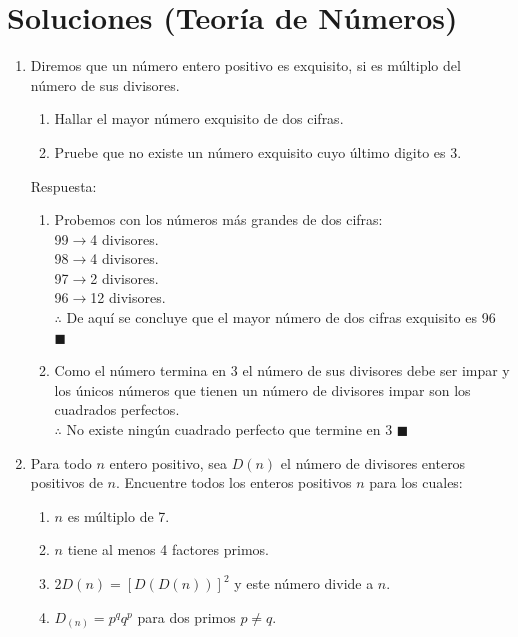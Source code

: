 \documentclass{book}
\begin{document}
    \section{Soluciones (Teoría de Números)}
    \begin{enumerate}
        \item Diremos que un número entero positivo es exquisito, si es múltiplo del número de sus divisores.

        \begin{enumerate}
            \item  Hallar el mayor número exquisito de dos cifras.
            \item Pruebe que no existe un número exquisito cuyo último digito es 3.
        \end{enumerate}
        Respuesta:
        \begin{enumerate}
            \item Probemos con los números más grandes de dos cifras:\\
            99$\rightarrow$4 divisores.\\
            98$\rightarrow$4 divisores.\\
            97$\rightarrow$2 divisores.\\
            96$\rightarrow$12 divisores.\\
            $ \therefore$ De aquí se concluye que el mayor número de dos cifras exquisito es 96 $\blacksquare$
            \item  Como el número termina en 3 el número de sus divisores debe ser impar y los únicos números que tienen un número de divisores impar son los cuadrados perfectos. \\
            $\therefore$ No existe ningún cuadrado perfecto que termine en 3 $\blacksquare$ \\
        \end{enumerate}
        \item  Para todo $n$ entero positivo, sea $D(n)$ el número de divisores enteros positivos de $n$. Encuentre todos los enteros positivos $n$ para los cuales:
        \begin{enumerate}
            \item $n$ es múltiplo de 7.
            \item $n$ tiene al menos 4 factores primos.
            \item $2D(n)={[D(D(n))]}^2$ y este número divide a $n$.
            \item  $D_{(n)}= p^qq^p$ para dos primos $ p \neq q  $.

\end{enumerate}
\end{enumerate}
\end{document}
